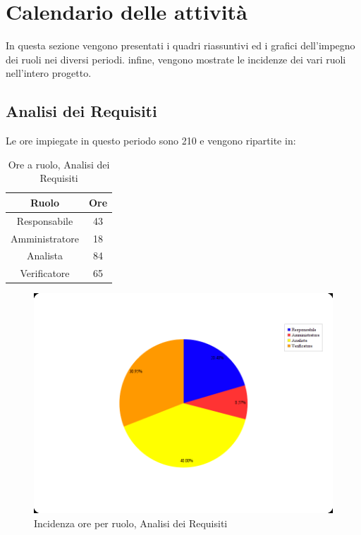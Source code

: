 \section{Calendario delle attività}
In questa sezione vengono presentati i quadri riassuntivi ed i grafici dell'impegno dei ruoli nei diversi periodi. infine, vengono mostrate le incidenze dei vari ruoli nell'intero progetto.

\subsection{Analisi dei Requisiti}
Le ore impiegate in questo periodo sono 210 e vengono ripartite in:
\begin{table}[H]
	\begin{center}
		\begin{tabular}{|c|c|}
			\hline
			\textbf{Ruolo}	& \textbf{Ore} \\
			\hline
			Responsabile	&	43	\\
			\hline
			Amministratore	&	18	\\
			\hline
			Analista		&	84	\\
			\hline
			Verificatore	&	65	\\
			\hline
		\end{tabular}
	\end{center}
	\caption{Ore a ruolo, Analisi dei Requisiti}
\end{table}

\begin{figure}[H]
	\centering
	\includegraphics[scale=0.3]{immagini/Grafi/OreRuoloRR}
	\caption{Incidenza ore per ruolo, Analisi dei Requisiti}
\end{figure}

